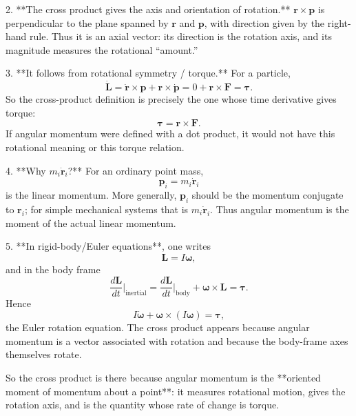 \documentclass[a4paper,11pt]{article}
\begin{document}
2. **The cross product gives the axis and orientation of rotation.**
   \(\mathbf r\times\mathbf p\) is perpendicular to the plane spanned by \(\mathbf r\) and \(\mathbf p\), with direction given by the right-hand rule. Thus it is an axial vector: its direction is the rotation axis, and its magnitude measures the rotational “amount.”

3. **It follows from rotational symmetry / torque.**
   For a particle,
   \[
   \dot{\mathbf L}
   =\dot{\mathbf r}\times\mathbf p+\mathbf r\times\dot{\mathbf p}
   =0+\mathbf r\times\mathbf F
   =\boldsymbol\tau.
   \]
   So the cross-product definition is precisely the one whose time derivative gives torque:
   \[
   \boldsymbol\tau=\mathbf r\times\mathbf F.
   \]
   If angular momentum were defined with a dot product, it would not have this rotational meaning or this torque relation.

4. **Why \(m_i\dot{\mathbf r}_i\)?**
   For an ordinary point mass,
   \[
   \mathbf p_i=m_i\dot{\mathbf r}_i
   \]
   is the linear momentum. More generally, \(\mathbf p_i\) should be the momentum conjugate to \(\mathbf r_i\); for simple mechanical systems that is \(m_i\dot{\mathbf r}_i\). Thus angular momentum is the moment of the actual linear momentum.

5. **In rigid-body/Euler equations**, one writes
   \[
   \mathbf L=I\boldsymbol\omega,
   \]
   and in the body frame
   \[
   \frac{d\mathbf L}{dt}\bigg|_{\text{inertial}}
   =
   \frac{d\mathbf L}{dt}\bigg|_{\text{body}}
   +\boldsymbol\omega\times\mathbf L
   =\boldsymbol\tau.
   \]
   Hence
   \[
   I\dot{\boldsymbol\omega}
   +\boldsymbol\omega\times(I\boldsymbol\omega)
   =\boldsymbol\tau,
   \]
   the Euler rotation equation. The cross product appears because angular momentum is a vector associated with rotation and because the body-frame axes themselves rotate.

So the cross product is there because angular momentum is the **oriented moment of momentum about a point**: it measures rotational motion, gives the rotation axis, and is the quantity whose rate of change is torque.

\hrulefill
\end{document}
